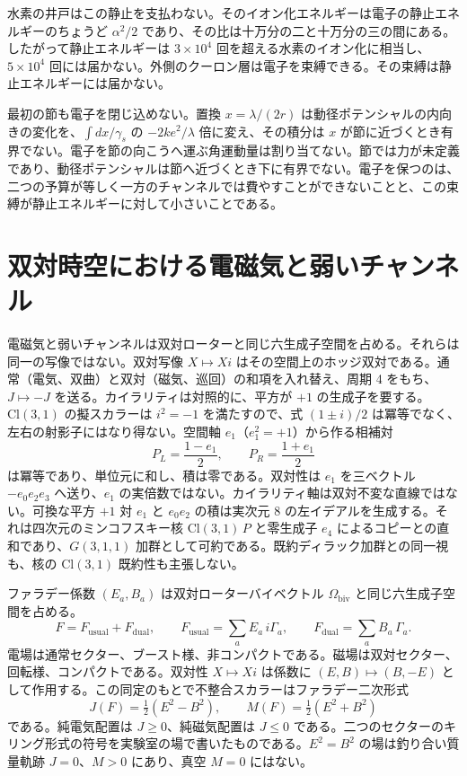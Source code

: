 \documentclass[a4paper]{article}
\begin{document}
水素の井戸はこの静止を支払わない。そのイオン化エネルギーは電子の静止エネルギーのちょうど \(\alpha^2/2\) であり、その比は十万分の二と十万分の三の間にある。したがって静止エネルギーは \(3\times 10^4\) 回を超える水素のイオン化に相当し、\(5\times 10^4\) 回には届かない。外側のクーロン層は電子を束縛できる。その束縛は静止エネルギーには届かない。

最初の節も電子を閉じ込めない。置換 \(x=\lambda/(2r)\) は動径ポテンシャルの内向きの変化を、\(\int dx/\gamma_s\) の \(-2ke^2/\lambda\) 倍に変え、その積分は \(x\) が節に近づくとき有界でない。電子を節の向こうへ運ぶ角運動量は割り当てない。節では力が未定義であり、動径ポテンシャルは節へ近づくとき下に有界でない。電子を保つのは、二つの予算が等しく一方のチャンネルでは費やすことができないことと、この束縛が静止エネルギーに対して小さいことである。

\section{双対時空における電磁気と弱いチャンネル}
\label{sec:unification}

電磁気と弱いチャンネルは双対ローターと同じ六生成子空間を占める。それらは同一の写像ではない。双対写像 $X\mapsto Xi$ はその空間上のホッジ双対である。通常（電気、双曲）と双対（磁気、巡回）の和項を入れ替え、周期 4 をもち、$J\mapsto -J$ を送る。カイラリティは対照的に、平方が $+1$ の生成子を要する。$\mathrm{Cl}(3,1)$ の擬スカラーは $i^2=-1$ を満たすので、式 $(1\pm i)/2$ は冪等でなく、左右の射影子にはなり得ない。空間軸 $e_1$（$e_1^2=+1$）から作る相補対
\[
P_L = \frac{1 - e_1}{2},\qquad P_R = \frac{1 + e_1}{2}
\]
は冪等であり、単位元に和し、積は零である。双対性は $e_1$ を三ベクトル $-e_0 e_2 e_3$ へ送り、$e_1$ の実倍数ではない。カイラリティ軸は双対不変な直線ではない。可換な平方 $+1$ 対 $e_1$ と $e_0e_2$ の積は実次元 $8$ の左イデアルを生成する。それは四次元のミンコフスキー核 $\mathrm{Cl}(3,1)\,P$ と零生成子 $e_4$ によるコピーとの直和であり、$G(3,1,1)$ 加群として可約である。既約ディラック加群との同一視も、核の $\mathrm{Cl}(3,1)$ 既約性も主張しない。

ファラデー係数 $(E_a,B_a)$ は双対ローターバイベクトル $\Omega_{\mathrm{biv}}$ と同じ六生成子空間を占める。
\begin{equation}
\label{eq:faraday-split}
F = F_{\mathrm{usual}}+F_{\mathrm{dual}},\qquad
F_{\mathrm{usual}}=\sum_a E_a\,i\Gamma_a,\qquad
F_{\mathrm{dual}}=\sum_a B_a\,\Gamma_a.
\end{equation}
電場は通常セクター、ブースト様、非コンパクトである。磁場は双対セクター、回転様、コンパクトである。双対性 $X\mapsto Xi$ は係数に $(E,B)\mapsto(B,-E)$ として作用する。この同定のもとで不整合スカラーはファラデー二次形式
\[
J(F)=\tfrac12(E^2-B^2),\qquad M(F)=\tfrac12(E^2+B^2)
\]
である。純電気配置は $J\ge 0$、純磁気配置は $J\le 0$ である。二つのセクターのキリング形式の符号を実験室の場で書いたものである。$E^2=B^2$ の場は釣り合い質量軌跡 $J=0$、$M>0$ にあり、真空 $M=0$ にはない。
\end{document}
